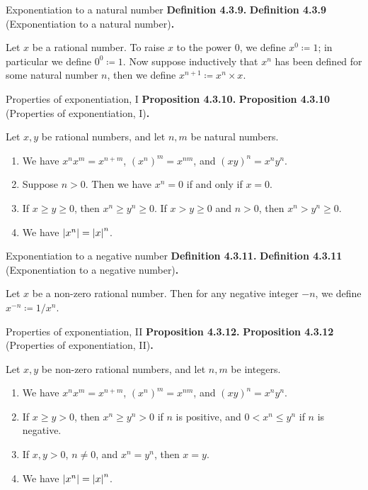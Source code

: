 \documentclass[12pt]{article}
\newenvironment{df}[2][\relax]{
\vspace{4mm}
    \noindent\setlength{\parskip}{1em}%
    \ifx#1\relax%
        \textbf{#2. }%
    \else%
        \textbf{#2} (#1)\textbf{. }%
    \fi%
    \ignorespaces%
}{}
\theoremstyle{remark}
\begin{document}
\begin{df}[Exponentiation to a natural number]{Definition 4.3.9}
     Let $x$ be a rational number.
     To raise $x$ to the power $0$, we define $x^0 \coloneqq 1$; in particular we define $0^0 \coloneqq 1$.
     Now suppose inductively that $x^n$ has been defined for some natural number $n$, then we define $x^{n+1} \coloneqq x^n \times x$.
\end{df}


\begin{df}[Properties of exponentiation, I]{Proposition 4.3.10}
    Let $x, y$ be rational numbers, and let $n, m$ be natural numbers.
    \begin{enumerate}[topsep=0mm,label=(\alph*)]
        \item We have $x^n x^m = x^{n+m}$, $(x^n)^m = x^{nm}$, and $(xy)^n = x^n y^n$.

        \item Suppose $n > 0$. Then we have $x^n =0$ if and only if $x = 0$.

        \item If $x \ge y \ge 0$, then $x^n \ge y^n \ge 0$. If $x > y \ge 0$ and $n > 0$, then $x^n > y^n \ge 0$.

        \item We have $\abs{x^n} = \abs{x}^n$.
    \end{enumerate}
\end{df}


\begin{df}[Exponentiation to a negative number]{Definition 4.3.11}
    Let $x$ be a non-zero rational number.
    Then for any negative integer $-n$, we define $x^{-n} \coloneqq 1/x^n$.
\end{df}


\begin{df}[Properties of exponentiation, II]{Proposition 4.3.12}
    Let $x, y$ be non-zero rational numbers, and let $n, m$ be integers.
    \begin{enumerate}[topsep=0mm,label=(\alph*)]
        \item We have $x^n x^m = x^{n+m}$, $(x^n)^m = x^{nm}$, and $(xy)^n = x^n y^n$.
        
        \item If $x \ge y > 0$, then $x^n \ge y^n > 0$ if $n$ is positive, and $0 < x^n \le y^n$ if $n$ is negative.

        \item If $x, y > 0$, $n \ne 0$, and $x^n = y^n$, then $x = y$.

        \item We have $\abs{x^n} = \abs{x}^n$.
    \end{enumerate}
\end{df}
\end{document}
